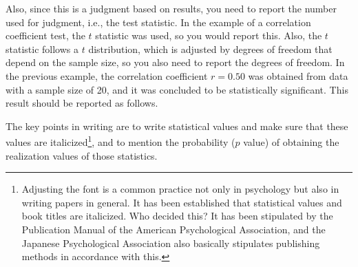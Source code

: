 \documentclass{ltjsbook}
\begin{document}
Also, since this is a judgment based on results, you need to report the number used for judgment, i.e., the test statistic. In the example of a correlation coefficient test, the $t$ statistic was used, so you would report this. Also, the $t$ statistic follows a $t$ distribution, which is adjusted by degrees of freedom that depend on the sample size, so you also need to report the degrees of freedom. In the previous example, the correlation coefficient $r=0.50$ was obtained from data with a sample size of 20, and it was concluded to be statistically significant. This result should be reported as follows.

The key points in writing are to write statistical values and make sure that these values are italicized\footnote{Adjusting the font is a common practice not only in psychology but also in writing papers in general. It has been established that statistical values and book titles are italicized. Who decided this? It has been stipulated by the Publication Manual of the American Psychological Association, and the Japanese Psychological Association also basically stipulates publishing methods in accordance with this.}, and to mention the probability ($p$ value) of obtaining the realization values of those statistics.
\end{document}
